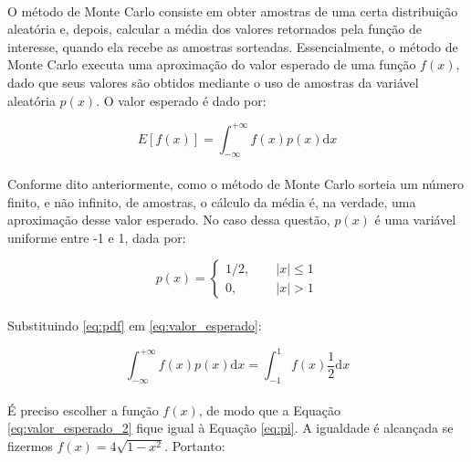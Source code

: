 \documentclass{report}
\begin{document}
\paragraph{} O método de Monte Carlo consiste em obter amostras de uma certa distribuição aleatória e, depois, calcular a média dos valores retornados pela função de interesse, quando ela recebe as amostras sorteadas. Essencialmente, o método de Monte Carlo executa uma aproximação do valor esperado de uma função $f(x)$, dado que seus valores são obtidos mediante o uso de amostras da variável aleatória $p(x)$. O valor esperado é dado por:

\begin{equation}\label{eq:valor_esperado}
E[f(x)] = \int_{-\infty}^{+\infty} \! f(x)p(x)\mathrm{d}x
\end{equation}

\paragraph{} Conforme dito anteriormente, como o método de Monte Carlo sorteia um número finito, e não infinito, de amostras, o cálculo da média é, na verdade, uma aproximação desse valor esperado. No caso dessa questão, $p(x)$ é uma variável uniforme entre -1 e 1, dada por: 

\begin{equation}\label{eq:pdf}
p(x) = \begin{cases}
			1/2, \quad\quad |x| \leq 1\\
			0, \quad\quad\quad |x| > 1
	   \end{cases}
\end{equation}

\paragraph{} Substituindo \eqref{eq:pdf} em \eqref{eq:valor_esperado}:

\begin{equation}\label{eq:valor_esperado_2}
\int_{-\infty}^{+\infty} \! f(x)p(x)\mathrm{d}x = \int_{-1}^{1} \! f(x)\frac{1}{2}\mathrm{d}x
\end{equation}

\paragraph{} É preciso escolher a função $f(x)$, de modo que a Equação \eqref{eq:valor_esperado_2} fique igual à Equação \eqref{eq:pi}. A igualdade é alcançada se fizermos $f(x) = 4\sqrt{1-x^2}$. Portanto:
\end{document}
